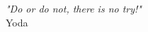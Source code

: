 \cleardoublepage
\thispagestyle{empty}
\vspace*{\fill}
\begin{flushright}
{\large \textit{"Do or do not, there is no try!"}}\\
Yoda
\end{flushright}
\vspace*{\fill}